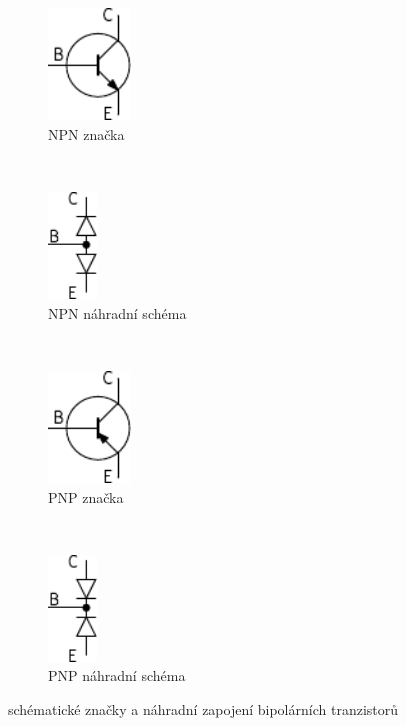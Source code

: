 			
			\begin{figure}[H]
        \centering
        \begin{subfigure}[b]{0.23\textwidth}
		      \includegraphics[width=22mm]{../img/NPN.pdf}
		      \caption{NPN značka}
        \end{subfigure}%
        ~ %
        \begin{subfigure}[b]{0.23\textwidth}
          \includegraphics[width=13mm]{../img/NPN_D.pdf}
          \caption{NPN náhradní schéma}
        \end{subfigure}
        ~ %
        \begin{subfigure}[b]{0.23\textwidth}
          \includegraphics[width=22mm]{../img/PNP.pdf}
          \caption{PNP značka}
        \end{subfigure}
         ~ %
        \begin{subfigure}[b]{0.23\textwidth}
          \includegraphics[width=13mm]{../img/PNP_D.pdf}
          \caption{PNP náhradní schéma}
        \end{subfigure}
        
        \caption{schématické značky a náhradní zapojení bipolárních tranzistorů}
        \label{fig:tranzistory}
        
\end{figure}
			
